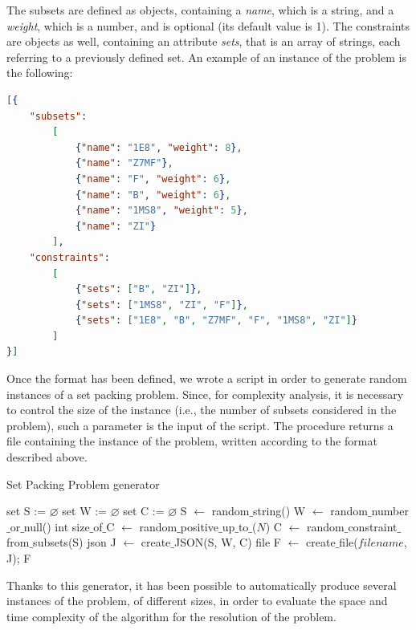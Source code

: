 \documentclass[oneside,a4paper]{article}
\begin{document}
The subsets are defined as objects, containing a \textit{name}, which is a string, and a \textit{weight}, which is a number, and is optional (its default value is 1). The constraints are objects as well, containing an attribute \textit{sets}, that is an array of strings, each referring to a previously defined set.
\newpage
An example of an instance of the problem is the following: 

\begin{lstlisting}[language=json,firstnumber=1]
[{
    "subsets": 
        [
            {"name": "1E8", "weight": 8},
            {"name": "Z7MF"},
            {"name": "F", "weight": 6},
            {"name": "B", "weight": 6},
            {"name": "1MS8", "weight": 5},
            {"name": "ZI"}
        ],
    "constraints":
        [
            {"sets": ["B", "ZI"]},
            {"sets": ["1MS8", "ZI", "F"]},
            {"sets": ["1E8", "B", "Z7MF", "F", "1MS8", "ZI"]}
        ]
}]
\end{lstlisting}

Once the format has been defined, we wrote a script in order to generate random instances of a set packing problem. Since, for complexity analysis, it is necessary to control the size of the instance (i.e., the number of subsets considered in the problem), such a parameter is the input of the script. The procedure returns a file containing the instance of the problem, written according to the format described above.
\begin{algorithm}
\caption{Set Packing Problem generator}
\begin{algorithmic}[1]

    \Variables
    \State set S := $\varnothing$  
    \State set W := $\varnothing$  
    \State set C := $\varnothing$  
    \EndVariables
        \State S $\leftarrow$ random$\_$string()   
        \State W $\leftarrow$ random$\_$number$\_$or$\_$null()  
    \EndWhile  \label{loop}
    \State int size$\_$of$\_$C $\leftarrow$ random$\_$positive$\_$up$\_$to$\_$($N$)  
        \State C $\leftarrow$ random$\_$constraint$\_$from$\_$subsets(S) 
    \EndWhile  \label{loop1}
    \State json J $\leftarrow$ create$\_$JSON(S, W, C)   
    \State file F $\leftarrow$ create$\_$file($filename$, J);  
    \State \Return F  
\EndProcedure

\end{algorithmic}
\end{algorithm}
Thanks to this generator, it has been possible to automatically produce several instances of the problem, of different sizes, in order to evaluate the space and time complexity of the algorithm for the resolution of the problem.
\end{document}

